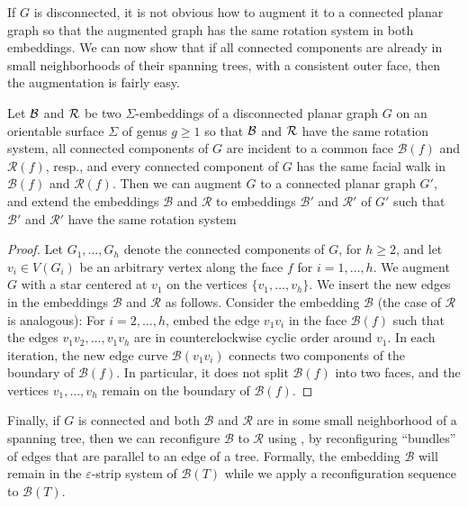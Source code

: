 \documentclass[a4paper,USenglish,cleveref,colorlinks=true,urlcolor=black,linkcolor=black,citecolor=black,thm-restate,authorcolumns]{lipics-v2021}
\theoremstyle{claimstyle}
\begin{document}
If $G$ is disconnected, it is not obvious how to augment it to a connected planar graph so that the augmented graph has the same rotation system in both embeddings.
We can now show that if all connected components are already in small neighborhoods of their spanning trees, with a consistent outer face, then the augmentation is fairly easy.

\begin{lemma}\label{lem:augmentation}
    Let $\cal B$ and $\cal R$  be two $\Sigma$-embeddings of a disconnected planar graph $G$ on an orientable surface $\Sigma$ of genus $g\geq 1$ so that $\cal B$ and $\cal R$ have the same rotation system, all connected components of $G$ are incident to a common face $\mathcal{B}(f)$ and $\mathcal{R}(f)$, resp., and every connected component of $G$ has the same facial walk in $\mathcal{B}(f)$ and $\mathcal{R}(f)$.
    Then we can augment $G$ to a connected planar graph $G'$, and extend the embeddings $\mathcal{B}$ and $\mathcal{R}$ to embeddings  $\mathcal{B}'$ and $\mathcal{R}'$ of $G'$ such that $\mathcal{B}'$ and $\mathcal{R}'$ have the same rotation system
\end{lemma}
\begin{proof}
    Let $G_1,\ldots,G_h$ denote the connected components of $G$, for $h\geq 2$, and let $v_i\in V(G_i)$ be an arbitrary vertex along the face $f$ for $i=1,\dots,h$.
    We augment $G$ with a star centered at $v_1$ on the vertices $\{v_1,\ldots , v_h\}$.
    We insert the new edges in the embeddings $\mathcal{B}$ and $\mathcal{R}$ as follows.
    Consider the embedding $\mathcal{B}$ (the case of $\mathcal{R}$ is analogous): For $i=2,\ldots, h$,
    embed the edge $v_1v_i$ in the face $\mathcal{B}(f)$ such that the edges $v_1v_2,\ldots, v_1v_h$ are in counterclockwise cyclic order around $v_1$.
    In each iteration, the new edge curve $\mathcal{B}(v_1v_i)$ connects two components of the boundary of $\mathcal{B}(f)$.
    In particular, it does not split $\mathcal{B}(f)$ into two faces, and the vertices $v_1,\dots, v_h$ remain on the boundary of $\mathcal{B}(f)$.
\end{proof}

Finally, if $G$ is connected and both $\mathcal{B}$ and $\mathcal{R}$ are in some small neighborhood of a spanning tree, then we can reconfigure $\mathcal{B}$ to $\mathcal{R}$ using , by reconfiguring \enquote{bundles} of edges that are parallel to an edge of a tree.
Formally, the embedding $\mathcal{B}$ will remain in the $\varepsilon$-strip system of $\mathcal{B}(T)$ while we apply a reconfiguration sequence to $\mathcal{B}(T)$.
\end{document}
